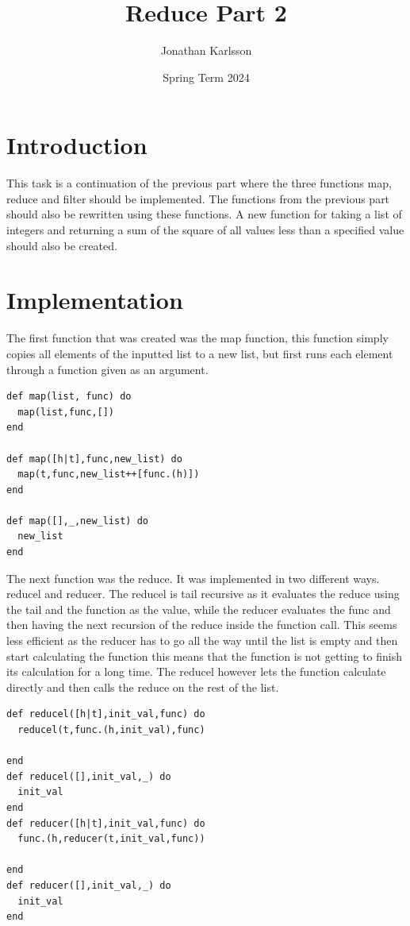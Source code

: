 \documentclass[a4paper,11pt]{article}
\begin{document}
\title{
    \textbf{Reduce Part 2}
}
\author{Jonathan Karlsson}
\date{Spring Term 2024}

\maketitle

\section*{Introduction}
This task is a continuation of the previous part where the three functions map, reduce and filter should be implemented.
The functions from the previous part should also be rewritten using these functions. A new function for taking a list of integers and returning a sum of the square of all values less than a specified value should also be created. 

\section*{Implementation}

The first function that was created was the map function, this function simply copies all elements of the inputted list to a new list, but first runs each element through a function given as an argument.
\begin{verbatim}
def map(list, func) do
  map(list,func,[])
end

def map([h|t],func,new_list) do
  map(t,func,new_list++[func.(h)])
end

def map([],_,new_list) do
  new_list
end
\end{verbatim}
The next function was the reduce. It was implemented in two different ways. reducel and reducer. The reducel is tail recursive as it evaluates the reduce using the tail and the function as the value, while the reducer evaluates the func and then having the next recursion of the reduce inside the function call. This seems less efficient as the reducer has to go all the way until the list is empty and then start calculating the function this means that the function is not getting to finish its calculation for a long time. 
The reducel however lets the function calculate directly and then calls the reduce on the rest of the list. 

\begin{verbatim}
def reducel([h|t],init_val,func) do
  reducel(t,func.(h,init_val),func)

end
def reducel([],init_val,_) do
  init_val
end
def reducer([h|t],init_val,func) do
  func.(h,reducer(t,init_val,func))

end
def reducer([],init_val,_) do
  init_val
end
\end{verbatim}
\end{document}
